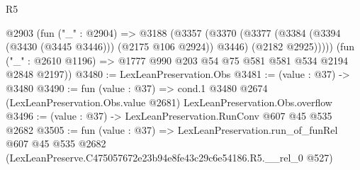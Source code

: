 \begin{lexlean}{R5}
\begin{coremodule}
      @2903
        (fun ("_" : @2904) =>
        @3188
          (@3357
            (@3370
              (@3377 (@3384 (@3394 (@3430 (@3445 @3446))) (@2175 @106 @2924)) @3446)
              (@2182 @2925)))))
      (fun ("_" : @2610 @1196) => @1777 @990 @203 @54 @75 @581 @581 @534 @2194 @2848 @2197))
@3480 := LexLeanPreservation.Obs
@3481 := (value : @37) -> @3480
@3490 := fun (value : @37) =>
  cond.{1} @3480 @2674 (LexLeanPreservation.Obs.value @2681) LexLeanPreservation.Obs.overflow
@3496 := (value : @37) -> LexLeanPreservation.RunConv @607 @45 @535 @2682
@3505 := fun (value : @37) =>
  LexLeanPreservation.run_of_funRel
    @607
    @45
    @535
    @2682
    (LexLeanPreserve.C475057672e23b94e8fe43c29c6e54186.R5.__rel_0 @527)
\end{coremodule}
\end{lexlean}

